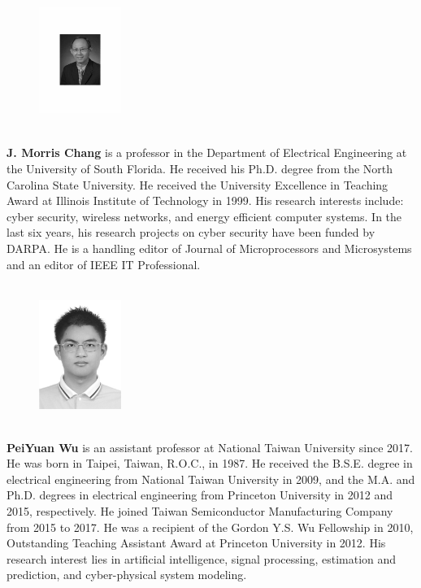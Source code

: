 \documentclass[final,5p,twocolumn]{elsarticle}
\begin{document}
	\begin{figure} 
		\includegraphics[width=1.05in,height=1.8in,clip,keepaspectratio]{biography/Chang_CP}
	\end{figure}\par
	\textbf{J. Morris Chang} is a professor in the Department of Electrical Engineering at the University of South Florida. He received his Ph.D. degree from the North Carolina State University. He received the University Excellence in Teaching Award at Illinois Institute of Technology in 1999. His research interests include: cyber security, wireless networks, and energy efficient computer systems. In the last six years, his research projects on cyber security have been funded by DARPA. He is a handling editor of Journal of Microprocessors and Microsystems and an editor of IEEE IT Professional.\par
	
	
	\begin{figure} 
		\includegraphics[width=1.05in,height=1.8in,clip,keepaspectratio]{biography/peiyuanwu_black}
	\end{figure}\par
	\textbf{PeiYuan Wu} is an assistant professor at National Taiwan University since 2017. He was born in Taipei, Taiwan, R.O.C., in 1987. He received the B.S.E. degree in electrical engineering from National Taiwan University in 2009, and the M.A. and Ph.D. degrees in electrical engineering from Princeton University in 2012 and 2015, respectively. He joined Taiwan Semiconductor Manufacturing Company from 2015 to 2017. He was a recipient of the Gordon Y.S. Wu Fellowship in 2010, Outstanding Teaching Assistant Award at Princeton University in 2012. His research interest lies in artificial intelligence, signal processing, estimation and prediction, and cyber-physical system modeling.\par
	
\end{document}
